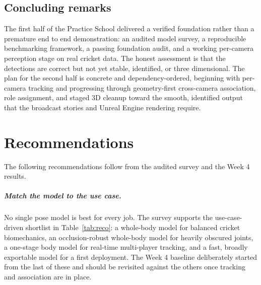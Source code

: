 \documentclass[oneside,openany]{book}
\begin{document}
\section{Concluding remarks}
The first half of the Practice School delivered a verified foundation rather than a premature end
to end demonstration: an audited model survey, a reproducible benchmarking framework, a passing
foundation audit, and a working per-camera perception stage on real cricket data. The honest
assessment is that the detections are correct but not yet stable, identified, or three
dimensional. The plan for the second half is concrete and dependency-ordered, beginning with
per-camera tracking and progressing through geometry-first cross-camera association, role
assignment, and staged 3D cleanup toward the smooth, identified output that the broadcast stories
and Unreal Engine rendering require.

\chapter{Recommendations}
\label{ch:recommendations}
The following recommendations follow from the audited survey and the Week 4 results.

\paragraph{Match the model to the use case.} No single pose model is best for every job. The
survey supports the use-case-driven shortlist in Table~\ref{tab:reco}: a whole-body model for
balanced cricket biomechanics, an occlusion-robust whole-body model for heavily obscured joints,
a one-stage body model for real-time multi-player tracking, and a fast, broadly exportable model
for a first deployment. The Week 4 baseline deliberately started from the last of these and
should be revisited against the others once tracking and association are in place.
\end{document}
